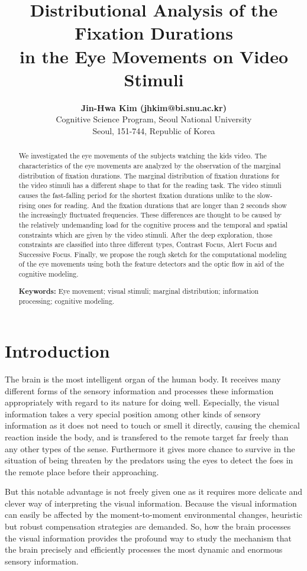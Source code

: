 \documentclass[10pt,letterpaper]{article}
\title{Distributional Analysis of the Fixation Durations \\
in the Eye Movements on Video Stimuli}
\author{{\large \bf Jin-Hwa Kim (jhkim@bi.snu.ac.kr)} \\
  Cognitive Science Program, Seoul National University \\
  Seoul, 151-744, Republic of Korea}
\begin{document}
\maketitle

\begin{abstract}
We investigated the eye movements of the subjects watching the kids video. The characteristics of the eye movements are analyzed by the observation of the marginal distribution of fixation durations. The marginal distribution of fixation durations for the video stimuli has a different shape to that for the reading task. The video stimuli causes the fast-falling period for the shortest fixation durations unlike to the slow-rising ones for reading. And the fixation durations that are longer than 2 seconds show the increasingly fluctuated frequencies. These differences are thought to be caused by the relatively undemanding load for the cognitive process and the temporal and spatial constraints which are given by the video stimuli. After the deep exploration, those constraints are classified into three different types, Contrast Focus, Alert Focus and Successive Focus. Finally, we propose the rough sketch for the computational modeling of the eye movements using both the feature detectors and the optic flow in aid of the cognitive modeling.

\textbf{Keywords:} 
Eye movement; visual stimuli; marginal distribution; information processing; cognitive modeling.
\end{abstract}


\section{Introduction}

The brain is the most intelligent organ of the human body. It receives many different forms of the sensory information and processes these information appropriately with regard to its nature for doing well. Especially, the visual information takes a very special position among other kinds of sensory information as it does not need to touch or smell it directly, causing the chemical reaction inside the body, and is transfered to the remote target far freely than any other types of the sense. Furthermore it gives more chance to survive in the situation of being threaten by the predators using the eyes to detect the foes in the remote place before their approaching. 

But this notable advantage is not freely given one as it requires more delicate and clever way of interpreting the visual information. Because the visual information can easily be affected by the moment-to-moment environmental changes, heuristic but robust compensation strategies are demanded. So, how the brain processes the visual information provides the profound way to study the mechanism that the brain precisely and efficiently processes the most dynamic and enormous sensory information.
\end{document}
